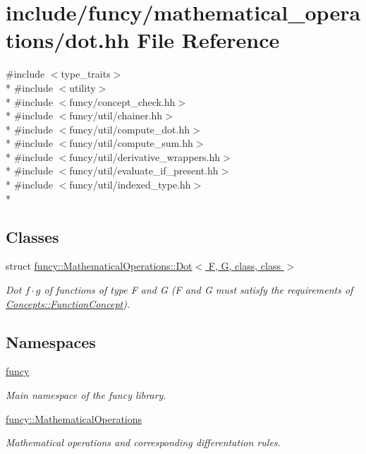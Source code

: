 \hypertarget{dot_8hh}{\section{include/funcy/mathematical\-\_\-operations/dot.hh File Reference}
\label{dot_8hh}
}
{\ttfamily \#include $<$type\-\_\-traits$>$}\\*
{\ttfamily \#include $<$utility$>$}\\*
{\ttfamily \#include $<$funcy/concept\-\_\-check.\-hh$>$}\\*
{\ttfamily \#include $<$funcy/util/chainer.\-hh$>$}\\*
{\ttfamily \#include $<$funcy/util/compute\-\_\-dot.\-hh$>$}\\*
{\ttfamily \#include $<$funcy/util/compute\-\_\-sum.\-hh$>$}\\*
{\ttfamily \#include $<$funcy/util/derivative\-\_\-wrappers.\-hh$>$}\\*
{\ttfamily \#include $<$funcy/util/evaluate\-\_\-if\-\_\-present.\-hh$>$}\\*
{\ttfamily \#include $<$funcy/util/indexed\-\_\-type.\-hh$>$}\\*
\subsection*{Classes}
\begin{DoxyCompactItemize}
\item 
struct \hyperlink{structfuncy_1_1MathematicalOperations_1_1Dot}{funcy\-::\-Mathematical\-Operations\-::\-Dot$<$ F, G, class, class $>$}
\begin{DoxyCompactList}\small\item\em Dot $f \cdot g$ of functions of type F and G (F and G must satisfy the requirements of \hyperlink{structfuncy_1_1Concepts_1_1FunctionConcept}{Concepts\-::\-Function\-Concept}). \end{DoxyCompactList}\end{DoxyCompactItemize}
\subsection*{Namespaces}
\begin{DoxyCompactItemize}
\item 
\hyperlink{namespacefuncy}{funcy}
\begin{DoxyCompactList}\small\item\em Main namespace of the funcy library. \end{DoxyCompactList}\item 
\hyperlink{namespacefuncy_1_1MathematicalOperations}{funcy\-::\-Mathematical\-Operations}
\begin{DoxyCompactList}\small\item\em Mathematical operations and corresponding differentation rules. \end{DoxyCompactList}\end{DoxyCompactItemize}
